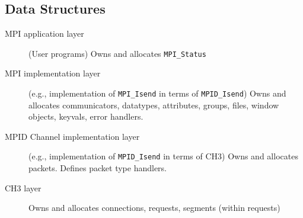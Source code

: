 \documentclass{article}
\def\code{\begingroup\makeustext\eatcode}
\def\eatcode#1{\texttt{#1}\endgroup}
\begin{document}
\subsection{Data Structures}
\begin{description}
\item[MPI application layer](User programs) Owns and allocates
  \code{MPI_Status} 
\item[MPI implementation layer](e.g., implementation of \code{MPI_Isend} in
  terms of \code{MPID_Isend}) Owns and allocates communicators, datatypes,
  attributes, groups, files, window objects, keyvals, error handlers.
\item[MPID Channel implementation layer](e.g., implementation of
  \code{MPID_Isend} in terms of CH3) Owns and allocates packets.
  Defines packet type handlers.
\item[CH3 layer] Owns and allocates connections, requests, segments (within
  requests) 
\end{description}












\end{document}

